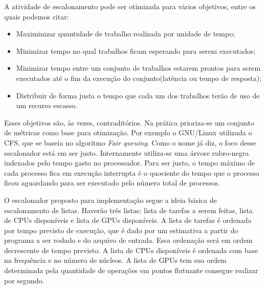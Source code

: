 A atividade de escalonamento pode ser otimizada para vários objetivos, entre os quais podemos citar:
\begin{itemize}
	\item Maximinizar quantidade de trabalho realizada por unidade de tempo;
	\item Minimizar tempo no qual trabalhos ficam esperando para serem executados;
	\item Minimizar tempo entre um conjunto de trabalhos estarem prontos para serem executados até o fim da execução do conjunto(latência ou tempo de resposta);
	\item Distribuir de forma justa o tempo que cada um dos trabalhos terão de uso de um recurso escasso.
\end{itemize}

Esses objetivos são, às vezes, contraditórios. Na prática prioriza-se um conjunto de métricas como base para otimização. Por exemplo o GNU/Linux utilizada o \acrfull{CFS}, que se baseia no algoritmo \textit{Fair queuing}. Como o nome já diz, o foco desse escalonador está em ser justo. Internamente utiliza-se uma árvore rubro-negra indexados pelo tempo gasto no processador. Para ser justo, o tempo máximo de cada processo fica em execução interrupta é o quociente do tempo que o processo ficou aguardando para ser executado pelo número total de processos.

O escalonador proposto para implementação segue a ideia básica de escalonamento de listas. Haverão três listas: lista de tarefas a serem feitas, lista de \acrshort{CPU}s disponíveis e lista de \acrshort{GPU}s disponíveis.
A lista de tarefas é ordenada por tempo previsto de execução, que é dado por um estimativa a partir do programa a ser rodado e do arquivo de entrada. Essa ordenação será em ordem decrescente de tempo previsto. A lista de \acrshort{CPU}s disponíveis é ordenada com base na frequência e no número de núcleos. A lista de \acrshort{GPU}s tem sua ordem determinada pela quantidade de operações em pontos flutuante consegue realizar por segundo.

